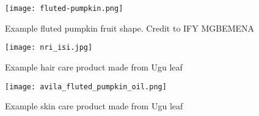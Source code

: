 \begin{figure}[h]
	\centering 
	\texttt{[image: fluted-pumpkin.png]}
	\caption{\label{fig:ike_ugu} Example fluted pumpkin fruit shape. Credit to IFY MGBEMENA}
\end{figure}

\begin{figure}[!h]
	\centering
	\texttt{[image: nri\_isi.jpg]}
	\caption{\label{fig:nri_isi} Example hair care product made from Ugu leaf}
\end{figure}

\begin{figure}[!h]
	\centering
	\texttt{[image: avila\_fluted\_pumpkin\_oil.png]}
	\caption{\label{fig:avila_product} Example skin care product made from Ugu leaf}
\end{figure}